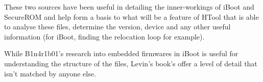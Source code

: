 
These two sources have been useful in detailing the inner-workings of iBoot and SecureROM and help form a basis to what will be a feature of HTool that is able to analyse these files, determine the version, device and any other useful information (for iBoot, finding the relocation loop for example).

While B1n4r1b01's research into embedded firmwares in iBoot is useful for understanding the structure of the files, Levin's book's offer a level of detail that isn't matched by anyone else.



